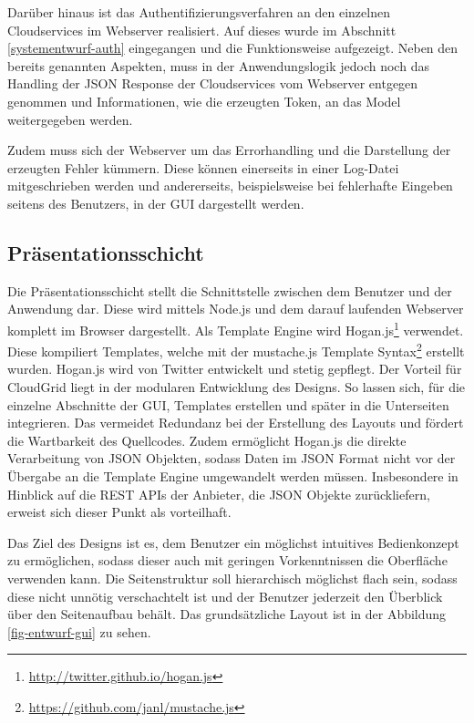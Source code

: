 Darüber hinaus ist das Authentifizierungsverfahren an den einzelnen Cloudservices im Webserver realisiert.
Auf dieses wurde im Abschnitt \ref{systementwurf-auth} eingegangen und die Funktionsweise aufgezeigt.
Neben den bereits genannten Aspekten, muss in der Anwendungslogik jedoch noch das Handling der \ac{JSON} Response der Cloudservices vom Webserver entgegen genommen und Informationen, wie die erzeugten Token, an das Model weitergegeben werden.

Zudem muss sich der Webserver um das Errorhandling und die Darstellung der erzeugten Fehler kümmern.
Diese können einerseits in einer Log-Datei mitgeschrieben werden und andererseits, beispielsweise bei fehlerhafte Eingeben seitens des Benutzers, in der \ac{GUI} dargestellt werden.

\subsection{Präsentationsschicht}
\label{systementwurf-praesentation}
Die Präsentationsschicht stellt die Schnittstelle zwischen dem Benutzer und der Anwendung dar.
Diese wird mittels Node.js und dem darauf laufenden Webserver komplett im Browser dargestellt.
Als Template Engine wird Hogan.js\footnote{\url{http://twitter.github.io/hogan.js}} verwendet.
Diese kompiliert Templates, welche mit der mustache.js Template Syntax\footnote{\url{https://github.com/janl/mustache.js}} erstellt wurden.
Hogan.js wird von Twitter entwickelt und stetig gepflegt.
Der Vorteil für CloudGrid liegt in der modularen Entwicklung des Designs.
So lassen sich, für die einzelne Abschnitte der \ac{GUI}, Templates erstellen und später in die Unterseiten integrieren.
Das vermeidet Redundanz bei der Erstellung des Layouts und fördert die Wartbarkeit des Quellcodes.
Zudem ermöglicht Hogan.js die direkte Verarbeitung von \ac{JSON} Objekten, sodass Daten im \ac{JSON} Format nicht vor der Übergabe an die Template Engine umgewandelt werden müssen.
Insbesondere in Hinblick auf die \ac{REST} \acp{API} der Anbieter, die JSON Objekte zurückliefern, erweist sich dieser Punkt als vorteilhaft.

Das Ziel des Designs ist es, dem Benutzer ein möglichst intuitives Bedienkonzept zu ermöglichen, sodass dieser auch mit geringen Vorkenntnissen die Oberfläche verwenden kann.
Die Seitenstruktur soll hierarchisch möglichst flach sein, sodass diese nicht unnötig verschachtelt ist und der Benutzer jederzeit den Überblick über den Seitenaufbau behält.
Das grundsätzliche Layout ist in der Abbildung \ref{fig-entwurf-gui} zu sehen.

